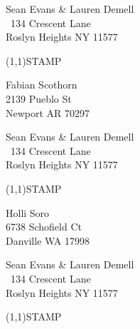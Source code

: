 \documentclass[12pt]{article}
\begin{document}
\begin{minipage}{.5\linewidth} \noindent
Sean Evans \& Lauren Demell\\\ 
134 Crescent Lane\\ 
Roslyn Heights NY 11577
\end{minipage}
\begin{minipage}{.5\linewidth \hspace{-.2in} \vspace{-.3in}}
\begin{flushright}
\framebox(1,1){STAMP}
\end{flushright}
\end{minipage}

\begin{center} \begin{Huge} \vspace*{\fill}
Fabian Scothorn\\
2139 Pueblo St\\
Newport AR 70297\\
\vspace{\fill} \end{Huge} \end{center}

\clearpage

\begin{minipage}{.5\linewidth} \noindent
Sean Evans \& Lauren Demell\\\ 
134 Crescent Lane\\ 
Roslyn Heights NY 11577
\end{minipage}
\begin{minipage}{.5\linewidth \hspace{-.2in} \vspace{-.3in}}
\begin{flushright}
\framebox(1,1){STAMP}
\end{flushright}
\end{minipage}

\begin{center} \begin{Huge} \vspace*{\fill}
Holli Soro\\
6738 Schofield Ct\\
Danville WA 17998\\
\vspace{\fill} \end{Huge} \end{center}

\clearpage

\begin{minipage}{.5\linewidth} \noindent
Sean Evans \& Lauren Demell\\\ 
134 Crescent Lane\\ 
Roslyn Heights NY 11577
\end{minipage}
\begin{minipage}{.5\linewidth \hspace{-.2in} \vspace{-.3in}}
\begin{flushright}
\framebox(1,1){STAMP}
\end{flushright}
\end{minipage}
\end{document}
